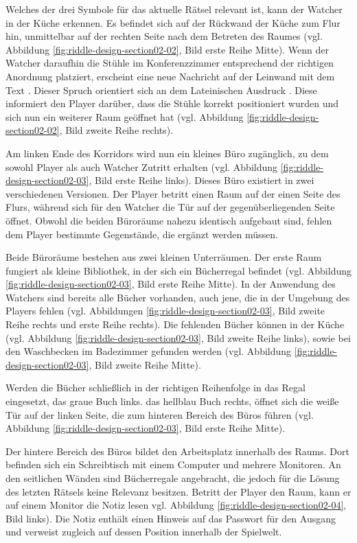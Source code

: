 Welches der drei Symbole für das aktuelle Rätsel relevant ist, kann der Watcher in der Küche erkennen. Es befindet sich auf der Rückwand der Küche zum Flur hin, unmittelbar auf der rechten Seite nach dem Betreten des Raumes (vgl. Abbildung \ref{fig:riddle-design-section02-02}, Bild erste Reihe Mitte). Wenn der Watcher daraufhin die Stühle im Konferenzzimmer entsprechend der richtigen Anordnung platziert, erscheint eine neue Nachricht auf der Leinwand mit dem Text . Dieser Spruch orientiert sich an dem Lateinischen Ausdruck . Diese informiert den Player darüber, dass die Stühle korrekt positioniert wurden und sich nun ein weiterer Raum geöffnet hat (vgl. Abbildung \ref{fig:riddle-design-section02-02}, Bild zweite Reihe rechts).

Am linken Ende des Korridors wird nun ein kleines Büro zugänglich, zu dem sowohl Player als auch Watcher Zutritt erhalten (vgl. Abbildung \ref{fig:riddle-design-section02-03}, Bild erste Reihe links). Dieses Büro existiert in zwei verschiedenen Versionen. Der Player betritt einen Raum auf der einen Seite des Flurs, während sich für den Watcher die Tür auf der gegenüberliegenden Seite öffnet. Obwohl die beiden Büroräume nahezu identisch aufgebaut sind, fehlen dem Player bestimmte Gegenstände, die ergänzt werden müssen.

Beide Büroräume bestehen aus zwei kleinen Unterräumen. Der erste Raum fungiert als kleine Bibliothek, in der sich ein Bücherregal befindet (vgl. Abbildung \ref{fig:riddle-design-section02-03}, Bild erste Reihe Mitte). In der Anwendung des Watchers sind bereits alle Bücher vorhanden, auch jene, die in der Umgebung des Players fehlen (vgl. Abbildungen \ref{fig:riddle-design-section02-03}, Bild zweite Reihe rechts und erste Reihe rechts). Die fehlenden Bücher können in der Küche (vgl. Abbildung \ref{fig:riddle-design-section02-03}, Bild zweite Reihe links), sowie bei den Waschbecken im Badezimmer gefunden werden (vgl. Abbildung \ref{fig:riddle-design-section02-03}, Bild zweite Reihe Mitte).

Werden die Bücher schließlich in der richtigen Reihenfolge in das Regal eingesetzt, das graue Buch links. das hellblau Buch rechts, öffnet sich die weiße Tür auf der linken Seite, die zum hinteren Bereich des Büros führen (vgl. Abbildung \ref{fig:riddle-design-section02-03}, Bild erste Reihe Mitte).

Der hintere Bereich des Büros bildet den Arbeitsplatz innerhalb des Raums. Dort befinden sich ein Schreibtisch mit einem Computer und mehrere Monitoren. An den seitlichen Wänden sind Bücherregale angebracht, die jedoch für die Lösung des letzten Rätsels keine Relevanz besitzen. Betritt der Player den Raum, kann er auf einem Monitor die Notiz  lesen vgl. Abbildung \ref{fig:riddle-design-section02-04}, Bild links). Die Notiz enthält einen Hinweis auf das Passwort für den Ausgang und verweist zugleich auf dessen Position innerhalb der Spielwelt.

